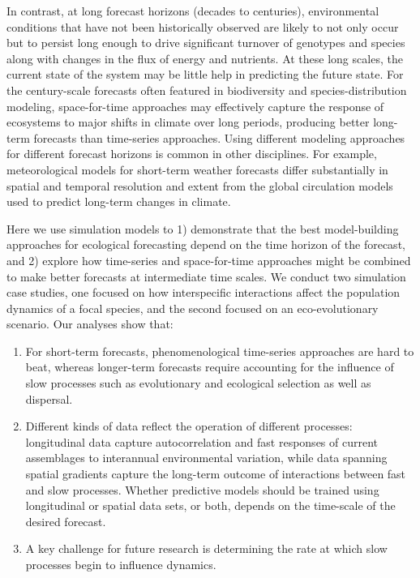 \documentclass[11pt]{article}
\begin{document}
In contrast, at long forecast horizons (decades to centuries),  environmental conditions that have not been 
historically observed are likely to not only occur but to persist long enough to drive significant turnover of genotypes and species 
along with changes in the flux of energy and nutrients.  At these long scales, the current state of the system may be 
little help in predicting the future state. For the century-scale forecasts often featured in biodiversity and 
species-distribution modeling, space-for-time approaches may effectively capture the response of ecosystems to major shifts 
in climate over long periods, producing better long-term forecasts than time-series approaches. 
Using different modeling approaches for different forecast horizons is common in other disciplines.
For example, meteorological models for short-term weather forecasts differ substantially in spatial
and temporal resolution and extent from the global circulation models used to predict long-term changes
in climate.

Here we use simulation models to 1) demonstrate that the best model-building approaches for ecological forecasting 
depend on the time horizon of the forecast, and 2) explore how time-series and space-for-time approaches might be 
combined to make better forecasts at intermediate time scales. We conduct two simulation case studies, one 
focused on how interspecific interactions affect the population dynamics of a focal species, and the second focused on
an eco-evolutionary scenario. Our analyses show that: 
\begin{enumerate}
	\item For short-term forecasts, phenomenological time-series approaches are hard to beat, whereas longer-term forecasts require accounting for the influence of slow processes such as evolutionary and ecological selection as well as dispersal.
	\item Different kinds of data reflect the operation of different processes: longitudinal data capture autocorrelation and fast responses of current assemblages to interannual environmental variation, while data spanning spatial gradients capture the long-term outcome of interactions between fast and slow processes.  Whether predictive models should be trained using longitudinal or spatial data sets, or both, depends on the time-scale of the desired forecast.
	\item A key challenge for future research is determining the rate at which slow processes begin to influence dynamics.
\end{enumerate}
\end{document}
